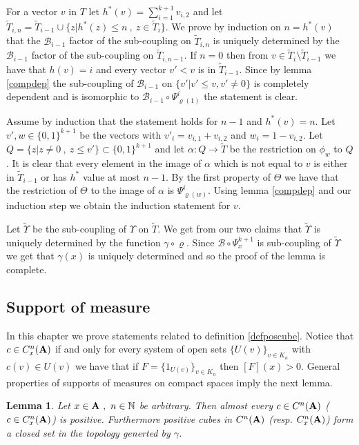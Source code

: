 \documentclass [11pt] {article}
\newtheorem{lemma}{Lemma}[section]
\def\bA{{\bf A}}
\begin{document}
For a vector $v$ in $T$ let $h^*(v)=\sum_{i=1}^{k+1}v_{i,2}$ and let $\tilde{T}_{i,n}=\tilde{T}_{i-1}\cup\{z|h^*(z)\leq n~,~z\in\tilde{T}_i\}$.
We prove by induction on $n=h^*(v)$ that the $\mathcal{B}_{i-1}$ factor of the sub-coupling on $\tilde{T}_{i,n}$ is uniquely determined by the $\mathcal{B}_{i-1}$ factor of the sub-coupling on $\tilde{T}_{i,n-1}$. If $n=0$ then from $v\in \tilde{T}_i\setminus \tilde{T}_{i-1}$ we have that $h(v)=i$ and every vector $v'< v$ is in $\tilde{T}_{i-1}$. Since by lemma \ref{compdep} the sub-coupling of $\mathcal{B}_{i-1}$ on $\{v'|v'\leq v,v'\neq 0\}$ is completely dependent and is isomorphic to $\mathcal{B}_{i-1}\circ\Psi_{\varrho(1)}^i$ the statement is clear.  

Assume by induction that the statement holds for $n-1$ and $h^*(v)=n$.  Let $v',w\in\{0,1\}^{k+1}$ be the vectors with $v'_i=v_{i,1}+v_{i,2}$ and $w_i=1-v_{i,2}$. Let $Q=\{z|z\neq 0~,~z\leq v'\}\subset\{0,1\}^{k+1}$ and let $\alpha:Q\rightarrow\tilde{T}$ be the restriction on $\phi_w$ to $Q$. It is clear that every element in the image of $\alpha$ which is not equal to $v$ is either in $\tilde{T}_{i-1}$ or has $h^*$ value at most $n-1$. By the first property of $\Theta$ we have that the restriction of $\Theta$ to the image of $\alpha$ is $\Psi_{\varrho(w)}^i$. Using lemma \ref{compdep} and our induction step we obtain the induction statement for $v$.

\medskip

Let $\tilde{\Upsilon}$ be the sub-coupling of $\Upsilon$ on $\tilde{T}$. We get from our two claims that $\tilde{\Upsilon}$ is uniquely determined by the function $\gamma\circ\varrho$.  Since $\mathcal{B}\circ\Psi_x^{k+1}$ is  sub-coupling of $\tilde{\Upsilon}$ we get that $\gamma(x)$ is uniquely determined and so the proof of the lemma is complete.

\medskip

\subsection{Support of measure}

In this chapter we prove statements related to definition \ref{defposcube}.
Notice that $c\in C^n_x(\bA)$ if and only for every system of open sets $\{U(v)\}_{v\in K_n}$ with $c(v)\in U(v)$ we have that if $F=\{1_{U(v)}\}_{v\in K_n}$ then $[F](x)>0$. General properties of supports of measures on compact spaces imply the next lemma. 

\begin{lemma}\label{ascubepos} Let $x\in\bA~,~n\in\mathbb{N}$ be arbitrary. Then almost every $c\in C^n(\bA)$ ($c\in C^n_x(\bA)$) is positive. Furthermore positive cubes in $C^n(\bA)$ (resp. $C_x^n(\bA)$) form a closed set in the topology generted by $\gamma$.
\end{lemma}
\end{document}
